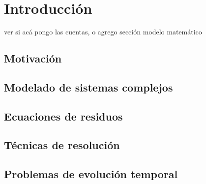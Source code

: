 \chapter{Introducción}

ver si acá pongo las cuentas, o agrego sección modelo matemático

\section{Motivación}
\label{1:motivacion}

\section{Modelado de sistemas complejos}
\label{1:modelado}

\section{Ecuaciones de residuos}
\label{1:ecuaciones}

\section{Técnicas de resolución}
\label{S:tecnicas}

\section{Problemas de evolución temporal}
\label{S:evolucion}